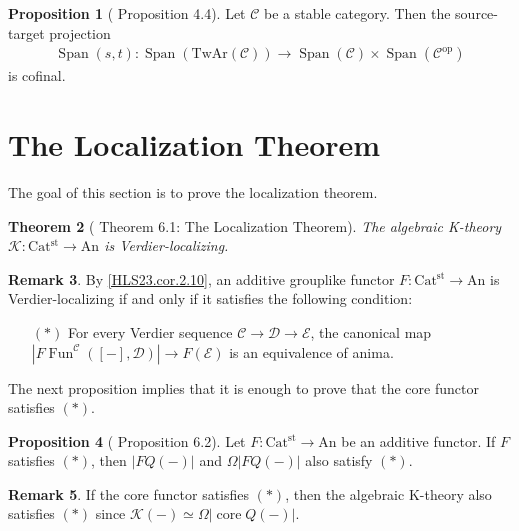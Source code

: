 \documentclass[a4paper,dvipdfmx,11pt,reqno]{amsart}
\DeclareMathOperator{\myop}{op}
\DeclareMathOperator{\Fun}{Fun}
\newcommand{\C}{\mathcal{C}}
\newcommand{\D}{\mathcal{D}}
\newcommand{\E}{\mathcal{E}}
\newcommand{\K}{\mathcal{K}}
\DeclareMathOperator{\core}{core}
\DeclareMathOperator{\asscat}{asscat}
\DeclareMathOperator{\Span}{Span}
\newcommand{\An}{\mathrm{An}}
\newcommand{\Catst}{\mathrm{Cat^{st}}}
\newcommand{\TwAr}{\mathrm{TwAr}}
\newcommand{\Sp}{\mathrm{Sp}}
\newtheorem{theorem}{Theorem}[section]
\theoremstyle{definition}
\newtheorem{proposition}[theorem]{Proposition}
\newtheorem{remark}[theorem]{Remark}
\begin{document}
\begin{proposition}[\cite{HLS23} Proposition 4.4] \label{HLS23.prop.4.4}
  Let $\C$ be a stable category.
  Then the source-target projection 
  \begin{align*}
    \Span(s,t) : \Span(\TwAr(\C)) \to \Span(\C) \times \Span(\C^{\myop})
  \end{align*}
  is cofinal.
\end{proposition}


\section{The Localization Theorem}

The goal of this section is to prove the localization theorem.

\begin{theorem}[\cite{HLS23} Theorem 6.1: The Localization Theorem] \label{thrm.localization_theorem}
  The algebraic K-theory $\K : \Catst \to \An$ is Verdier-localizing.
\end{theorem}

\begin{remark}
  By \cref{HLS23.cor.2.10}, an additive grouplike functor $F : \Catst \to \An$ is Verdier-localizing if and only if it satisfies the following condition:
  \begin{itemize}
    \item[$(\ast)$] For every Verdier sequence $\C \to \D \to \E$, the canonical map $|F\Fun^{\C}([-],\D)| \to F(\E)$ is an equivalence of anima.
  \end{itemize}
\end{remark}

The next proposition implies that it is enough to prove that the core functor satisfies $(\ast)$.

\begin{proposition}[\cite{HLS23} Proposition 6.2] \label{HLS23.prop.6.2} 
  Let $F : \Catst \to \An$ be an additive functor.
  If $F$ satisfies $(\ast)$, then $|FQ(-)|$ and $\Omega|FQ(-)|$ also satisfy $(\ast)$.
\end{proposition}

\begin{remark}
  If the core functor satisfies $(\ast)$, then the algebraic K-theory also satisfies $(\ast)$ since $\K(-) \simeq \Omega|\core Q(-)|$.
\end{remark}
\end{document}
